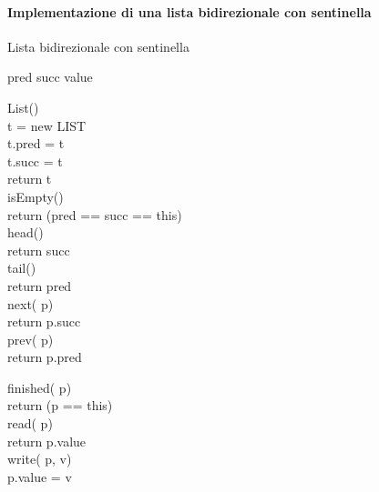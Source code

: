 \paragraph{Implementazione di una lista bidirezionale con sentinella}
\begin{code}{Lista bidirezionale con sentinella}
    \begin{minipage}[t]{0.48\textwidth}
         pred\hfill{}
         succ\hfill{}
         value\hfill{}

        \ind{} List()\\
             t = new LIST\\
            t.pred = t\\
            t.succ = t\\
            return t\\

        \ind{} isEmpty()\\
            return (pred == succ == this)\\

        \ind{} head()\\
            return succ\\

        \ind{} tail()\\
            return pred\\

        \ind{} next( p)\\
            return p.succ\\

        \ind{} prev( p)\\
            return p.pred\\
    \end{minipage}
    \hfill
    \begin{minipage}[t]{0.48\textwidth}
        \par\noindent{}
        \rmbreak\ind{} finished( p)\\
            return (p == this)\\

        \ind{} read( p)\\
            return p.value\\

        \ind write( p,  v)\\
            p.value = v\\


\end{minipage}
\end{code}
